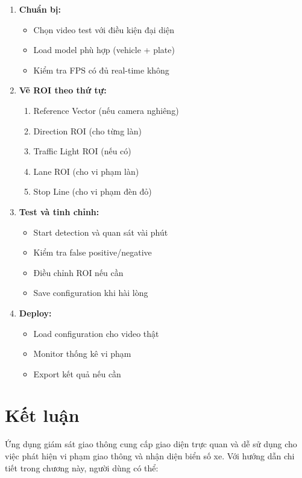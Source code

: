 \begin{enumerate}
    \item \textbf{Chuẩn bị:}
    \begin{itemize}
        \item Chọn video test với điều kiện đại diện
        \item Load model phù hợp (vehicle + plate)
        \item Kiểm tra FPS có đủ real-time không
    \end{itemize}
    
    \item \textbf{Vẽ ROI theo thứ tự:}
    \begin{enumerate}
        \item Reference Vector (nếu camera nghiêng)
        \item Direction ROI (cho từng làn)
        \item Traffic Light ROI (nếu có)
        \item Lane ROI (cho vi phạm làn)
        \item Stop Line (cho vi phạm đèn đỏ)
    \end{enumerate}
    
    \item \textbf{Test và tinh chỉnh:}
    \begin{itemize}
        \item Start detection và quan sát vài phút
        \item Kiểm tra false positive/negative
        \item Điều chỉnh ROI nếu cần
        \item Save configuration khi hài lòng
    \end{itemize}
    
    \item \textbf{Deploy:}
    \begin{itemize}
        \item Load configuration cho video thật
        \item Monitor thống kê vi phạm
        \item Export kết quả nếu cần
    \end{itemize}
\end{enumerate}

\section{Kết luận}

Ứng dụng giám sát giao thông cung cấp giao diện trực quan và dễ sử dụng cho việc phát hiện vi phạm giao thông và nhận diện biển số xe. Với hướng dẫn chi tiết trong chương này, người dùng có thể:

